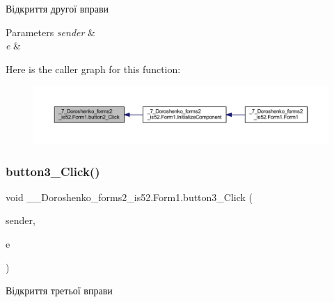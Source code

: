 Відкриття другої вправи 


\begin{DoxyParams}{Parameters}
{\em sender} & \\
\hline
{\em e} & \\
\hline
\end{DoxyParams}
Here is the caller graph for this function\+:
\nopagebreak
\begin{figure}[H]
\begin{center}
\leavevmode
\includegraphics[width=350pt]{class__7___doroshenko__forms2__is52_1_1_form1_a396c65df583a69ba0692af2fb86ea43b_icgraph}
\end{center}
\end{figure}
\hypertarget{class__7___doroshenko__forms2__is52_1_1_form1_a2057eaec9016139eb5b5dca1ccb19f25}{}\label{class__7___doroshenko__forms2__is52_1_1_form1_a2057eaec9016139eb5b5dca1ccb19f25} 
\subsubsection{\texorpdfstring{button3\+\_\+\+Click()}{button3\_Click()}}
{\footnotesize\ttfamily void \+\_\+\_\+\+Doroshenko\+\_\+forms2\+\_\+is52.\+Form1.\+button3\+\_\+\+Click (\begin{DoxyParamCaption}\item[{object}]{sender,  }\item[{Event\+Args}]{e }\end{DoxyParamCaption})\hspace{0.3cm}{\ttfamily [private]}}



Відкриття третьої вправи 


